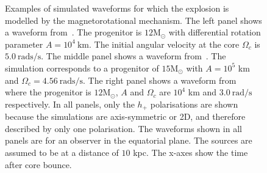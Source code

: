 \documentclass[aps,twocolumn,showpacs,groupedaddress, nofootinbib]{revtex4}  %
\begin{document}

%
%
\begin{figure}
     \begin{center}
        \quad
        \quad
    \end{center}
    \caption{Examples of simulated waveforms for which the explosion is modelled by
the magnetorotational mechanism. The left panel shows a waveform 
from~\cite{abdikamalov2014measuring}. The progenitor is $12\text{M}_\odot$ with
differential rotation parameter $A=10^4~\text{km}$. The initial angular velocity
at the core $\Omega_c$ is $5.0~\text{rads/s}$. The middle panel shows a waveform
from~\cite{dimmelmeier2008gravitational}. The simulation corresponds to a
progenitor of $15\text{M}_\odot$ with $A=10^5$ km and $\Omega_c =
4.56~\text{rads/s}$.  The right panel shows a waveform
from~\cite{richers2017equation} where the progenitor is $12\text{M}_\odot$, $A$
and $\Omega_c$ are $10^4$ km and $3.0~\text{rad/s}$ respectively. In all panels,
only the $h_{+}$ polarisations are shown because the simulations are
axis-symmetric or 2D, and therefore described by only one polarisation. 
The waveforms shown in all panels are for an observer in the equatorial plane.
The sources are assumed to be at a distance of $10$ kpc. The x-axes show the time after 
core bounce.\label{fig:magwaveforms}} 
\end{figure}
\end{document}

